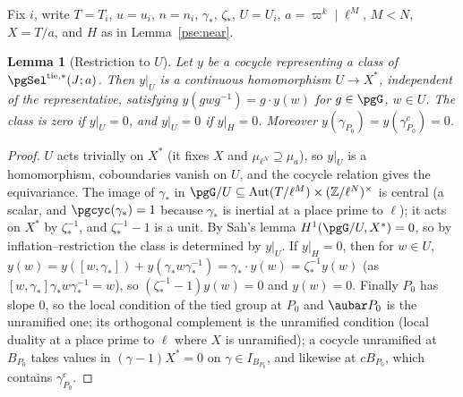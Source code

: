 \documentclass[10pt]{amsart}
\newtheorem{lemma}[theorem]{Lemma}
\theoremstyle{definition}
\theoremstyle{remark}
\newcommand{\Z}{\mathbb Z}
\begin{document}
Fix $i$, write $T=T_i$, $u=u_i$, $n=n_i$, $\gamma_*$, $\zeta_*$, $U=U_i$, $a=\varpi^k\mid\ell^M$,
$M<N$, $X=T/a$, and $H$ as in Lemma~\ref{pse:near}.

\begin{lemma}[Restriction to $U$]\label{pse:restrict}
Let $y$ be a cocycle representing a class of $\pgSel^{\mathrm{tie},*}(J;a)$. Then $y|_U$ is a
continuous homomorphism $U\to X^*$, independent of the representative, satisfying
$y(gwg^{-1})=g\cdot y(w)$ for $g\in\pgG$, $w\in U$. The class is zero if $y|_U=0$, and $y|_U=0$ if
$y|_H=0$. Moreover $y(\gamma_{P_0})=y(\gamma_{P_0}^c)=0$.
\end{lemma}
\begin{proof}
$U$ acts trivially on $X^*$ (it fixes $X$ and $\mu_{\ell^N}\supseteq\mu_a$), so $y|_U$ is a
homomorphism, coboundaries vanish on $U$, and the cocycle relation gives the equivariance. The image
of $\gamma_*$ in $\pgG/U\subseteq\operatorname{Aut}(T/\ell^M)\times(\Z/\ell^N)^\times$ is central (a
scalar, and $\pgcyc(\gamma_*)=1$ because $\gamma_*$ is inertial at a place prime to $\ell$); it acts on
$X^*$ by $\zeta_*^{-1}$, and $\zeta_*^{-1}-1$ is a unit. By Sah's lemma $H^1(\pgG/U,X^*)=0$, so by
inflation--restriction the class is determined by $y|_U$. If $y|_H=0$, then for $w\in U$,
$y(w)=y([w,\gamma_*])+y(\gamma_*w\gamma_*^{-1})=\gamma_*\cdot y(w)=\zeta_*^{-1}y(w)$ (as $[w,
\gamma_*]\gamma_*w\gamma_*^{-1}=w$), so $(\zeta_*^{-1}-1)y(w)=0$ and $y(w)=0$. Finally $P_0$ has
slope $0$, so the local condition of the tied group at $P_0$ and $\aubar P_0$ is the unramified one;
its orthogonal complement is the unramified condition (local duality at a place prime to $\ell$
where $X$ is unramified); a cocycle unramified at $B_{P_0}$ takes values in $(\gamma-1)X^*=0$ on
$\gamma\in I_{B_{P_0}}$, and likewise at $cB_{P_0}$, which contains $\gamma_{P_0}^c$.
\end{proof}
\end{document}
